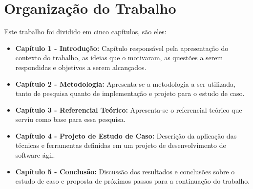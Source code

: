 \section{Organização do Trabalho}
\label{int:org}
Este trabalho foi dividido em cinco capítulos, são eles:

\begin{itemize}
    \item \textbf{Capítulo 1 - Introdução:} Capítulo responsável pela apresentação do contexto do trabalho, as ideias que o motivaram, as questões a serem respondidas e objetivos a serem alcançados.
    \item \textbf{Capítulo 2 - Metodologia:} Apresenta-se a metodologia a ser utilizada, tanto de pesquisa quanto de implementação e projeto para o estudo de caso.
    \item \textbf{Capítulo 3 - Referencial Teórico:} Apresenta-se o referencial teórico que serviu como base para essa pesquisa.
    \item \textbf{Capítulo 4 - Projeto de Estudo de Caso:} Descrição da aplicação das técnicas e ferramentas definidas em um projeto de desenvolvimento de software ágil.
    \item \textbf{Capítulo 5 - Conclusão:} Discussão dos resultados e conclusões sobre o estudo de caso e proposta de próximos passos para a continuação do trabalho.
\end{itemize}
